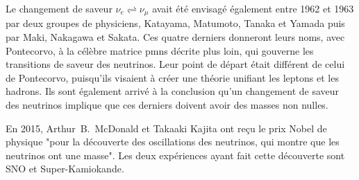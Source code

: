             Le changement de saveur $\nu_e\rightleftharpoons\nu_{\mu}$ avait été envisagé également entre 1962 et 1963 par deux groupes de physiciens, Katayama, Matumoto, Tanaka et Yamada\cite{Nakagawa1963} puis par Maki,  Nakagawa et  Sakata\cite{Maki1962}. Ces quatre derniers donneront leurs noms, avec Pontecorvo, à la célèbre matrice \gls{pmns} décrite plus loin, qui gouverne les transitions de saveur des neutrinos. Leur point de départ était différent de celui de Pontecorvo, puisqu'ils visaient à créer une théorie unifiant les leptons et les hadrons. Ils sont également arrivé à la conclusion qu'un changement de saveur des neutrinos implique que ces derniers doivent avoir des masses non nulles.
            
            En 2015, Arthur~B.~McDonald et Takaaki Kajita ont reçu le prix Nobel de physique "pour la découverte des oscillations des neutrinos, qui montre que les neutrinos ont une masse". Les deux expériences ayant fait cette découverte sont SNO\cite{Aharmim2013} et Super-Kamiokande\cite{Fukuda1998}.
            
